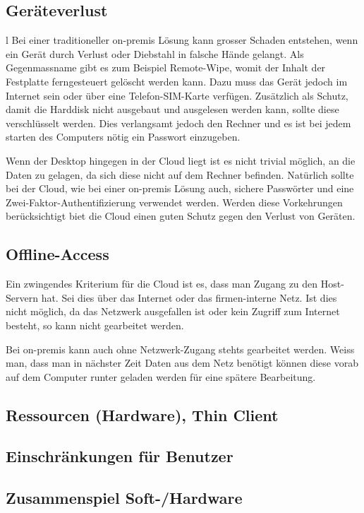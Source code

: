 \subsection{Geräteverlust}l
Bei einer traditioneller on-premis Lösung kann grosser Schaden entstehen, wenn ein Gerät durch Verlust oder Diebstahl in falsche Hände gelangt.
Als Gegenmassname gibt es zum Beispiel Remote-Wipe, womit der Inhalt der Festplatte ferngesteuert gelöscht werden kann. Dazu muss das Gerät jedoch im Internet sein oder über eine Telefon-SIM-Karte verfügen.
Zusätzlich als Schutz, damit die Harddisk nicht ausgebaut und ausgelesen werden kann, sollte diese verschlüsselt werden. Dies verlangsamt jedoch den Rechner und es ist bei jedem starten des Computers nötig ein Passwort einzugeben.

Wenn der Desktop hingegen in der Cloud liegt ist es nicht trivial möglich, an die Daten zu gelagen, da sich diese nicht auf dem Rechner befinden.
Natürlich sollte bei der Cloud, wie bei einer on-premis Lösung auch, sichere Passwörter und eine Zwei-Faktor-Authentifizierung verwendet werden. Werden diese Vorkehrungen berücksichtigt biet die Cloud einen guten Schutz gegen den Verlust von Geräten.

\subsection{Offline-Access}
Ein zwingendes Kriterium für die Cloud ist es, dass man Zugang zu den Host-Servern hat. Sei dies über das Internet oder das firmen-interne Netz. Ist dies nicht möglich, da das Netzwerk ausgefallen ist oder kein Zugriff zum Internet besteht, so kann nicht gearbeitet werden.

Bei on-premis kann auch ohne Netzwerk-Zugang stehts gearbeitet werden. Weiss man, dass man in nächster Zeit Daten aus dem Netz benötigt können diese vorab auf dem Computer runter geladen werden für eine spätere Bearbeitung.

\subsection{Ressourcen (Hardware), Thin Client}

\subsection{Einschränkungen für Benutzer}

\subsection{Zusammenspiel Soft-/Hardware}

